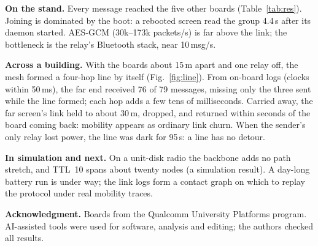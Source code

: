 \documentclass[10pt,twocolumn,letterpaper]{article}
\newcommand{\sub}[1]{\smallskip\noindent\textsf{\textbf{#1}}\enspace}
\begin{document}
\sub{On the stand.} Every message reached the five other boards
(Table~\ref{tab:res}). Joining is dominated by the boot: a rebooted
screen read the group 4.4\,s after its daemon started. AES-GCM (30k--173k packets/s) is
far above the link; the bottleneck is the relay's Bluetooth stack, near
10\,msg/s.

\sub{Across a building.} With the boards about 15\,m apart and one relay
off, the mesh formed a four-hop line by itself (Fig.~\ref{fig:line}).
From on-board logs (clocks within 50\,ms), the far end received 76 of 79
messages, missing only the three sent while the line formed; each hop
adds a few tens of milliseconds.
Carried away, the far screen's link held to about 30\,m, dropped, and
returned within seconds of the board coming back: mobility appears as
ordinary link churn. When the sender's only relay lost power, the line
was dark for 95\,s: a line has no detour.

\sub{In simulation and next.} On a unit-disk radio the backbone adds no
path stretch, and TTL~10 spans about twenty nodes (a simulation result).
A day-long battery run is under way; the link logs form a contact graph
on which to replay the protocol under real mobility traces.

\smallskip
\noindent\textsf{\textbf{Acknowledgment.}} Boards from the Qualcomm
University Platforms program. AI-assisted tools were used for software,
analysis and editing; the authors checked all results.

\scriptsize
\let\oldthebib\thebibliography
\renewcommand{\thebibliography}[1]{\oldthebib{#1}\setlength{\itemsep}{0pt}\setlength{\parsep}{0pt}}
\titlespacing*{\section}{0pt}{3pt}{1pt}


\end{document}
